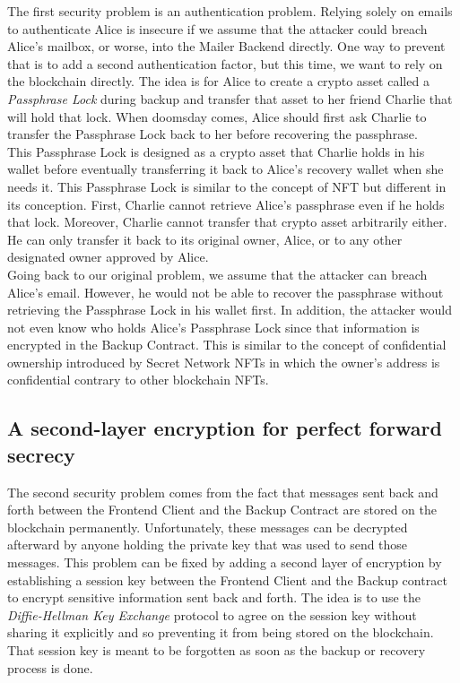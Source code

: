 \documentclass[runningheads]{llncs}
\begin{document}
The first security problem is an authentication problem. Relying solely on emails to authenticate Alice is insecure if we assume that the attacker could breach Alice’s mailbox, or worse, into the Mailer Backend directly. One way to prevent that is to add a second authentication factor, but this time, we want to rely on the blockchain directly. The idea is for Alice to create a crypto asset called a {\em Passphrase Lock} during backup and transfer that asset to her friend Charlie that will hold that lock. When doomsday comes, Alice should first ask Charlie to transfer the Passphrase Lock back to her before recovering the passphrase. \\

This Passphrase Lock is designed as a crypto asset that Charlie holds in his wallet before eventually transferring it back to Alice's recovery wallet when she needs it. This Passphrase Lock is similar to the concept of NFT \cite{wang2021non} but different in its conception. First, Charlie cannot retrieve Alice's passphrase even if he holds that lock. Moreover, Charlie cannot transfer that crypto asset arbitrarily either. He can only transfer it back to its original owner, Alice, or to any other designated owner approved by Alice. \\

Going back to our original problem, we assume that the attacker can breach Alice's email. However, he would not be able to recover the passphrase without retrieving the Passphrase Lock in his wallet first. In addition, the attacker would not even know who holds Alice's Passphrase Lock since that information is encrypted in the Backup Contract. This is similar to the concept of confidential ownership introduced by Secret Network NFTs in which the owner's address is confidential contrary to other blockchain NFTs. 

\subsection{A second-layer encryption for perfect forward secrecy}

The second security problem comes from the fact that messages sent back and forth between the Frontend Client and the Backup Contract are stored on the blockchain permanently. Unfortunately, these messages can be decrypted afterward by anyone holding the private key that was used to send those messages. This problem can be fixed by adding a second layer of encryption by establishing a session key between the Frontend Client and the Backup contract to encrypt sensitive information sent back and forth. The idea is to use the {\em Diffie-Hellman Key Exchange} protocol to agree on the session key without sharing it explicitly and so preventing it from being stored on the blockchain. That session key is meant to be forgotten as soon as the backup or recovery process is done. \\
\end{document}
